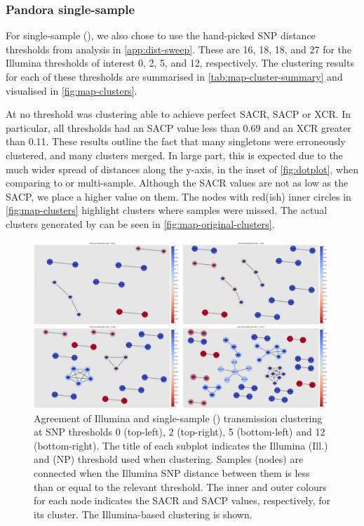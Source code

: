 \subsubsection{Pandora single-sample}

For \pandora{} single-sample (), we also chose to use the hand-picked SNP distance thresholds from analysis in \autoref{app:dist-sweep}. These are 16, 18, 18, and 27 for the Illumina thresholds of interest 0, 2, 5, and 12, respectively. The clustering results for each of these thresholds are summarised in \autoref{tab:map-cluster-summary} and visualised in \autoref{fig:map-clusters}. 

At no threshold was \pandora{} \vrb{} clustering able to achieve perfect SACR, SACP or XCR. In particular, all thresholds had an SACP value less than 0.69 and an XCR greater than 0.11. These results outline the fact that many singletons were erroneously clustered, and many clusters merged. In large part, this is expected due to the much wider spread of distances along the y-axis, in the inset of \autoref{fig:dotplot},  when comparing \pandora{}  to \bcftools{} or \pandora{} multi-sample. Although the SACR values are not as low as the SACP, we place a higher value on them. The nodes with red(ish) inner circles in \autoref{fig:map-clusters} highlight clusters where samples were missed. The actual clusters generated by \pandora{}  can be seen in \autoref{fig:map-original-clusters}.

\begin{figure}
\begin{center}
\includegraphics[width=0.90\columnwidth]{Chapter2/Figs/pandora_map_clusters.png}
\caption{{Agreement of Illumina and \pandora{} single-sample (\ont{}) transmission clustering at SNP thresholds 0 (top-left), 2 (top-right), 5 (bottom-left) and 12 (bottom-right). The title of each subplot indicates the Illumina (Ill.) and \ont{} (NP) threshold used when clustering. Samples (nodes) are connected when the Illumina SNP distance between them is less than or equal to the relevant threshold. The inner and outer colours for each node indicates the SACR and SACP values, respectively, for its cluster. The Illumina-based clustering is shown.
{\label{fig:map-clusters}}%
}}
\end{center}
\end{figure}

